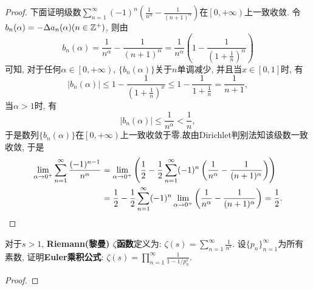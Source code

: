 \begin{quizb}
\begin{proof}
下面证明级数\(\sum_{n=1}^{\infty}(-1)^n\left(\frac{1}{n^\alpha}-\frac{1}{(n+1)^\alpha}\right)\)在\(\left[0,+\infty\right)\)上一致收敛. 令\(b_n(\alpha)=-\Delta a_n(\alpha)(n\in\mathbb{Z}^+)\), 则由\[b_n(\alpha)=\frac{1}{n^\alpha}-\frac{1}{(n+1)^\alpha}=\frac{1}{n^\alpha}\left(1-\frac{1}{\left(1+\displaystyle\frac{1}{n}\right)^\alpha}\right)\]可知, 对于任何\(\alpha\in\left[0,+\infty\right)\), \(\{b_n(\alpha)\}\)关于\(n\)单调减少, 并且当\(x\in[0,1]\)时, 有\[\left|b_n(\alpha)\right|\leqslant 1-\frac{1}{\displaystyle\left(1+\frac{1}{n}\right)^x}\leqslant 1-\frac{1}{\displaystyle 1+\frac{1}{n}}=\frac{1}{n+1},\]
当\(\alpha>1\)时, 有\[\left|b_n(\alpha)\right|\leqslant\frac{1}{n^\alpha}<\frac{1}{n},\]于是数列\(\{b_n(\alpha)\}\)在\(\left[0,+\infty\right)\)上一致收敛于零.故由Dirichlet判别法知该级数一致收敛, 于是\[\begin{split}
\lim_{\alpha\rightarrow 0^+}\sum_{n=1}^{\infty}\frac{(-1)^{n-1}}{n^\alpha}&=\lim_{\alpha\rightarrow0^+}\left(\frac{1}{2}-\frac{1}{2}\sum_{n=1}^{\infty}(-1)^n\left(\frac{1}{n^\alpha}-\frac{1}{(n+1)^\alpha}\right)\right)\\&=\frac{1}{2}-\frac{1}{2}\sum_{n=1}^{\infty}(-1)^n\lim_{\alpha\rightarrow0^+}\left(\frac{1}{n^\alpha}-\frac{1}{(n+1)^\alpha}\right)=\frac{1}{2}.\qedhere
\end{split}\]
\end{proof}
\woe 对于\(s>1\), \textbf{Riemann(黎曼) \(\zeta\)函数}定义为: \(\zeta(s)=\sum_{n=1}^{\infty}\frac{1}{n^s}\). 设\(\{p_n\}_{n=1}^{\infty}\)为所有素数, 证明\textbf{Euler乘积公式}: \(\zeta(s)=\prod_{n=1}^{\infty}\frac{1}{1-1/p_n^s}\).
\begin{proof}


\end{proof}
\end{quizb}
